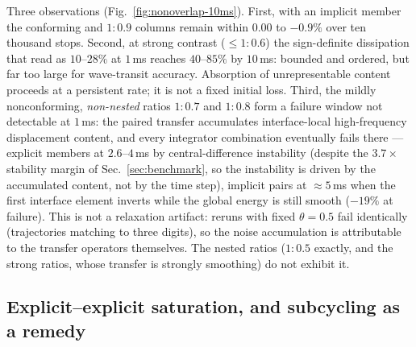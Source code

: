 \documentclass[11pt]{article}
\begin{document}
Three observations (Fig.~\ref{fig:nonoverlap-10ms}). First, with an
implicit member the conforming and $1{:}0.9$ columns remain within $0.00$ to
$-0.9\%$ over ten thousand stops. Second, at strong contrast
($\le 1{:}0.6$) the sign-definite dissipation that read as $10$--$28\%$ at
$1$\,ms reaches $40$--$85\%$ by $10$\,ms: bounded and ordered, but far too
large for wave-transit accuracy. Absorption of unrepresentable content proceeds at a
persistent rate; it is not a fixed initial loss. Third, the mildly nonconforming,
\emph{non-nested}
ratios $1{:}0.7$ and $1{:}0.8$ form a failure window not detectable at $1$\,ms:
the paired transfer accumulates interface-local high-frequency displacement
content, and every integrator combination eventually fails there ---
explicit members at $2.6$--$4$\,ms by central-difference instability
(despite the $3.7\times$ stability margin of Sec.~\ref{sec:benchmark}, so
the instability is driven by the accumulated content, not by the time
step), implicit pairs at $\approx 5$\,ms when the first interface element
inverts while the global energy is still smooth ($-19\%$ at failure). This is not a
relaxation artifact: reruns with fixed $\theta = 0.5$ fail identically
(trajectories matching to three digits), so the noise accumulation is attributable
to the transfer operators themselves. The nested ratios ($1{:}0.5$ exactly,
and the strong ratios, whose transfer is strongly smoothing) do not exhibit
it.

\subsection{Explicit--explicit saturation, and subcycling as a remedy}
\end{document}
